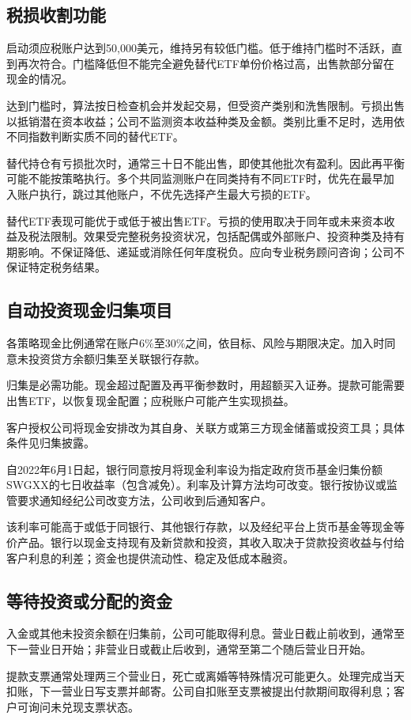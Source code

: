 \documentclass[UTF8,fontset=none,11pt,a4paper]{ctexart}
\begin{document}
\subsection*{税损收割功能}
启动须应税账户达到50,000美元，维持另有较低门槛。低于维持门槛时不活跃，直到再次符合。门槛降低但不能完全避免替代ETF单份价格过高，出售款部分留在现金的情况。


达到门槛时，算法按日检查机会并发起交易，但受资产类别和洗售限制。亏损出售以抵销潜在资本收益；公司不监测资本收益种类及金额。类别比重不足时，选用依不同指数判断实质不同的替代ETF。


替代持仓有亏损批次时，通常三十日不能出售，即使其他批次有盈利。因此再平衡可能不能按策略执行。多个共同监测账户在同类持有不同ETF时，优先在最早加入账户执行，跳过其他账户，不优先选择产生最大亏损的ETF。


替代ETF表现可能优于或低于被出售ETF。亏损的使用取决于同年或未来资本收益及税法限制。效果受完整税务投资状况，包括配偶或外部账户、投资种类及持有期影响。不保证降低、递延或消除任何年度税负。应向专业税务顾问咨询；公司不保证特定税务结果。


\subsection*{自动投资现金归集项目}
各策略现金比例通常在账户6\%至30\%之间，依目标、风险与期限决定。加入时同意未投资贷方余额归集至关联银行存款。


归集是必需功能。现金超过配置及再平衡参数时，用超额买入证券。提款可能需要出售ETF，以恢复现金配置；应税账户可能产生实现损益。


客户授权公司将现金安排改为其自身、关联方或第三方现金储蓄或投资工具；具体条件见归集披露。


自2022年6月1日起，银行同意按月将现金利率设为指定政府货币基金归集份额SWGXX的七日收益率（包含减免）。利率及计算方法均可改变。银行按协议或监管要求通知经纪公司改变方法，公司收到后通知客户。


该利率可能高于或低于同银行、其他银行存款，以及经纪平台上货币基金等现金等价产品。银行以现金支持现有及新贷款和投资，其收入取决于贷款投资收益与付给客户利息的利差；资金也提供流动性、稳定及低成本融资。


\subsection*{等待投资或分配的资金}
入金或其他未投资余额在归集前，公司可能取得利息。营业日截止前收到，通常至下一营业日开始；非营业日或截止后收到，通常至第二个随后营业日开始。


提款支票通常处理两三个营业日，死亡或离婚等特殊情况可能更久。处理完成当天扣账，下一营业日写支票并邮寄。公司自扣账至支票被提出付款期间取得利息；客户可询问未兑现支票状态。
\end{document}
